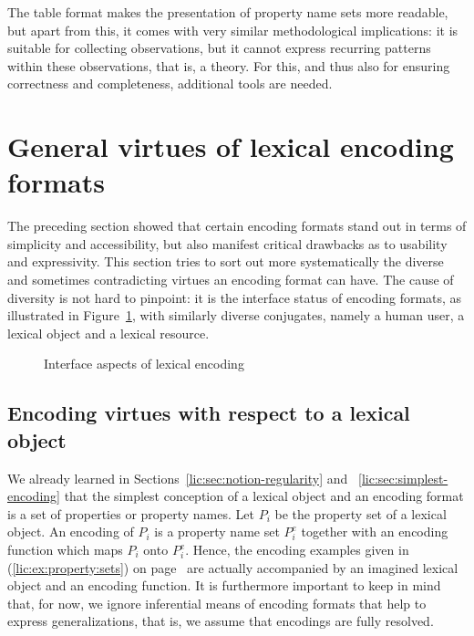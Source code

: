 \documentclass[output=paper
,modfonts
,nonflat
,biblatexbackend=biber
]{langsci/langscibook}
\begin{document}
The table format makes the presentation of property name sets more readable, but apart from this, it comes with very similar methodological implications: it is suitable for collecting observations, but it cannot express recurring patterns within these observations, that is, a theory. For this, and thus also for ensuring correctness and completeness, additional tools are needed.


%
\section{General virtues of lexical encoding formats}
\label{lic:sec:general-virtues}

The preceding section showed that certain encoding formats stand out in terms of simplicity and accessibility, but also manifest critical drawbacks as to usability and expressivity. This section tries to sort out more systematically the diverse and sometimes contradicting virtues an encoding format can have. The cause of diversity is not hard to pinpoint: it is the interface status of encoding formats, as illustrated in Figure~\ref{lic:fig:encoding-aspects}, with similarly diverse conjugates, namely a human user, a lexical object and a lexical resource.
\begin{figure}[tp]
  \centering 
  \caption{Interface aspects of lexical encoding}
  \label{lic:fig:encoding-aspects}
\end{figure}

\subsection{Encoding virtues with respect to a lexical object}
\label{lic:sec:virtues-object}

We already learned in Sections~\ref{lic:sec:notion-regularity} and ~\ref{lic:sec:simplest-encoding} that the simplest conception of a lexical object and an encoding format is a set of properties or property names. Let $P_i$ be the property set of a lexical object. An encoding of $P_i$ is a property name set $P^e_i$ together with an encoding function which maps $P_i$ onto $P^e_i$. Hence, the encoding examples given in (\ref{lic:ex:property:sets}) on page~\pageref{lic:ex:property:sets} are actually accompanied by an imagined lexical object and an encoding function. It is furthermore important to keep in mind that, for now, we ignore inferential means of encoding formats that help to express generalizations, that is, we assume that encodings are fully resolved.
\end{document}
